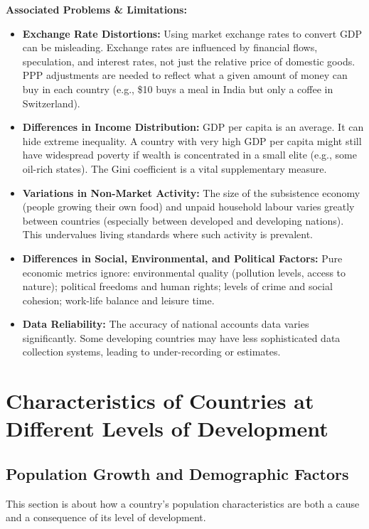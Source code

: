 \documentclass[11pt, a4paper, twoside]{book}
\begin{document}
\textbf{Associated Problems \& Limitations:}
\begin{itemize}
  \item \textbf{Exchange Rate Distortions:} Using market exchange rates to convert GDP can be misleading. Exchange rates are influenced by financial flows, speculation, and interest rates, not just the relative price of domestic goods. PPP adjustments are needed to reflect what a given amount of money can buy in each country (e.g., \$10 buys a meal in India but only a coffee in Switzerland).
  \item \textbf{Differences in Income Distribution:} GDP per capita is an average. It can hide extreme inequality. A country with very high GDP per capita might still have widespread poverty if wealth is concentrated in a small elite (e.g., some oil-rich states). The Gini coefficient is a vital supplementary measure.
  \item \textbf{Variations in Non-Market Activity:} The size of the subsistence economy (people growing their own food) and unpaid household labour varies greatly between countries (especially between developed and developing nations). This undervalues living standards where such activity is prevalent.
  \item \textbf{Differences in Social, Environmental, and Political Factors:} Pure economic metrics ignore: environmental quality (pollution levels, access to nature); political freedoms and human rights; levels of crime and social cohesion; work-life balance and leisure time.
  \item \textbf{Data Reliability:} The accuracy of national accounts data varies significantly. Some developing countries may have less sophisticated data collection systems, leading to under-recording or estimates.
\end{itemize}

\section{Characteristics of Countries at Different Levels of Development}

\subsection{Population Growth and Demographic Factors}

This section is about how a country's population characteristics are both a cause and a consequence of its level of development.
\end{document}
